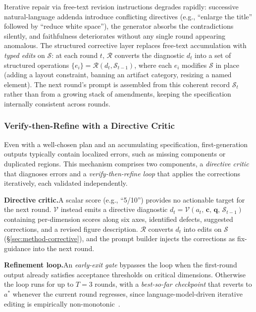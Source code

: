 \documentclass{llmxive}
\begin{document}
Iterative repair via free-text revision instructions degrades rapidly: successive natural-language addenda introduce conflicting directives (e.g., ``enlarge the title'' followed by ``reduce white space''), the generator absorbs the contradictions silently, and faithfulness deteriorates without any single round appearing anomalous. The structured corrective layer replaces free-text accumulation with \emph{typed edits} on $\mathcal{S}$: at each round $t$, $\mathcal{R}$ converts the diagnostic $d_t$ into a set of structured operations $\{e_i\} = \mathcal{R}(d_t, \mathcal{S}_{t-1})$, where each $e_i$ modifies $\mathcal{S}$ in place (adding a layout constraint, banning an artifact category, resizing a named element). The next round's prompt is assembled from this coherent record $\mathcal{S}_t$ rather than from a growing stack of amendments, keeping the specification internally consistent across rounds. 

\subsubsection{Verify-then-Refine with a Directive Critic}
\label{sec:method-verify}

Even with a well-chosen plan and an accumulating specification, first-generation outputs typically contain localized errors, such as missing components or duplicated regions. This mechanism comprises two components, a \emph{directive critic} that diagnoses errors and a \emph{verify-then-refine loop} that applies the corrections iteratively, each validated independently.

\textbf{Directive critic.}\quad A scalar score (e.g., ``5/10'') provides no actionable target for the next round. $\mathcal{V}$ instead emits a directive diagnostic $d_t = \mathcal{V}(a_t,\,\mathbf{c},\,\mathbf{q},\,\mathcal{S}_{t-1})$ containing per-dimension scores along six axes, identified defects, suggested corrections, and a revised figure description. $\mathcal{R}$ converts $d_t$ into edits on $\mathcal{S}$ (\S\ref{sec:method-corrective}), and the prompt builder injects the corrections as fix-guidance into the next round.

\textbf{Refinement loop.}\quad An \emph{early-exit gate} bypasses the loop when the first-round output already satisfies acceptance thresholds on critical dimensions. Otherwise the loop runs for up to $T{=}3$ rounds, with a \emph{best-so-far checkpoint} that reverts to $a^*$ whenever the current round regresses, since language-model-driven iterative editing is empirically non-monotonic~\citep{madaan2023selfrefine}.
\end{document}
